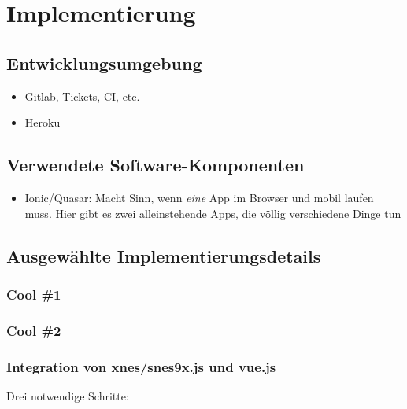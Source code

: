 \chapter{Implementierung}\label{implementierung}

\blindtext[1]

\section{Entwicklungsumgebung}\label{entwicklungsumgebung}

\begin{itemize}
\tightlist
\item
  Gitlab, Tickets, CI, etc.
\item
  Heroku
\end{itemize}

\section{Verwendete
Software-Komponenten}\label{verwendete-software-komponenten}

\begin{itemize}
\tightlist
\item
  Ionic/Quasar: Macht Sinn, wenn \emph{eine} App im Browser und mobil
  laufen muss. Hier gibt es zwei alleinstehende Apps, die völlig
  verschiedene Dinge tun
\end{itemize}

\section{Ausgewählte
Implementierungsdetails}\label{ausgewuxe4hlte-implementierungsdetails}

\subsection{Cool \#1}\label{cool-1}

\subsection{Cool \#2}\label{cool-2}

\subsection{Integration von xnes/snes9x.js und
vue.js}\label{integration-von-xnessnes9x.js-und-vue.js}

Drei notwendige Schritte:

